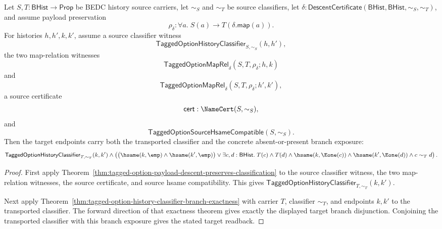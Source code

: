 \begin{theorem}
\label{thm:tagged-option-payload-descent-target-branch-readback}
Let $S,T:\mathsf{BHist}\to\mathsf{Prop}$ be BEDC history source carriers, let
$\sim_S$ and $\sim_T$ be source classifiers, let
$\delta:\mathsf{DescentCertificate}(\mathsf{BHist},\mathsf{BHist},\sim_S,\sim_T)$,
and assume payload preservation
$$
\rho_{\delta}:\forall a.\;S(a)\to T(\delta.\mathsf{map}(a)).
$$
For histories $h,h',k,k'$, assume a source classifier witness
$$
\mathsf{TaggedOptionHistoryClassifier}_{S,\sim_S}(h,h'),
$$
the two map-relation witnesses
$$
\mathsf{TaggedOptionMapRel}_{\delta}(S,T,\rho_{\delta};h,k)
$$
and
$$
\mathsf{TaggedOptionMapRel}_{\delta}(S,T,\rho_{\delta};h',k'),
$$
a source certificate
$$
\mathsf{cert}:\NameCert(S,\sim_S),
$$
and
$$
\mathsf{TaggedOptionSourceHsameCompatible}(S,\sim_S).
$$
Then the target endpoints carry both the transported classifier and the concrete
absent-or-present branch exposure:
$$
\mathsf{TaggedOptionHistoryClassifier}_{T,\sim_T}(k,k')
\land
\left(
\bigl(\hsame(k,\emp)\land\hsame(k',\emp)\bigr)
\lor
\exists c,d:\mathsf{BHist}.\;
T(c)\land T(d)\land
\hsame(k,\Eone(c))\land \hsame(k',\Eone(d))\land c\sim_T d
\right).
$$
\end{theorem}
\begin{proof}
First apply Theorem~\ref{thm:tagged-option-payload-descent-preserves-classification}
to the source classifier witness, the two map-relation witnesses, the source
certificate, and source hsame compatibility. This gives
$\mathsf{TaggedOptionHistoryClassifier}_{T,\sim_T}(k,k')$.

Next apply
Theorem~\ref{thm:tagged-option-history-classifier-branch-exactness} with carrier
$T$, classifier $\sim_T$, and endpoints $k,k'$ to the transported classifier.
The forward direction of that exactness theorem gives exactly the displayed
target branch disjunction. Conjoining the transported classifier with this
branch exposure gives the stated target readback.
\end{proof}

